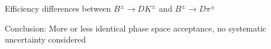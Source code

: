 \documentclass{beamer}
\begin{document}
\begin{frame}{Efficiency differences between $B^\pm\to DK^\pm$ and $B^\pm\to D\pi^\pm$}
\begin{figure}
\begin{subfigure}{0.33\textwidth}
    \end{subfigure}
  \end{figure}
  \begin{center}
    Conclusion: More or less identical phase space acceptance, no systematic uncertainty considered
  \end{center}
\end{frame}  
\end{document}
